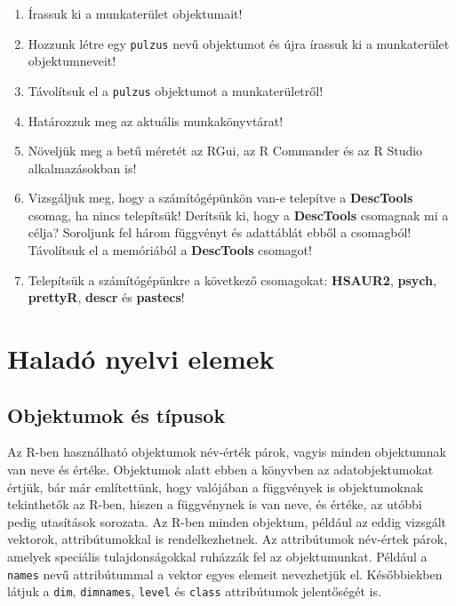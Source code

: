 \documentclass[
]{book}
\makeatletter
\providecommand{\tightlist}{%
  \setlength{\itemsep}{0pt}\setlength{\parskip}{0pt}}
\newenvironment{kframe}{%
\medskip{}
\setlength{\fboxsep}{.8em}
 \def\at@end@of@kframe{}%
 \ifinner\ifhmode%
  \def\at@end@of@kframe{\end{minipage}}%
  \begin{minipage}{\columnwidth}%
 \fi\fi%
 \def\FrameCommand##1{\hskip\@totalleftmargin \hskip-\fboxsep
 \colorbox{shadecolor}{##1}\hskip-\fboxsep
     \hskip-\linewidth \hskip-\@totalleftmargin \hskip\columnwidth}%
 \MakeFramed {\advance\hsize-\width
   \@totalleftmargin\z@ \linewidth\hsize
   \@setminipage}}%
 {\par\unskip\endMakeFramed%
 \at@end@of@kframe}
\newenvironment{rmdblock}[1]
  {
  \begin{itemize}
  \renewcommand{\labelitemi}{
    \raisebox{-.7\height}[0pt][0pt]{
      {\setkeys{Gin}{width=3em,keepaspectratio}\texttt{[image: images/\#1]}}
    }
  }
  \setlength{\fboxsep}{1em}
  \begin{kframe}
  \item
  }
  {
  \end{kframe}
  \end{itemize}
  }
\newenvironment{rmdlevel1}
  {\begin{rmdblock}{level1}}
  {\end{rmdblock}}
\makeatother
\begin{document}
\begin{rmdlevel1}
\begin{enumerate}
\def\labelenumi{\arabic{enumi}.}
\tightlist
\item
  Írassuk ki a munkaterület objektumait!
\item
  Hozzunk létre egy \texttt{pulzus} nevű objektumot és újra írassuk ki a munkaterület objektumneveit!
\item
  Távolítsuk el a \texttt{pulzus} objektumot a munkaterületről!
\item
  Határozzuk meg az aktuális munkakönyvtárat!
\item
  Növeljük meg a betű méretét az RGui, az R Commander és az R Studio alkalmazásokban is!
\item
  Vizsgáljuk meg, hogy a számítógépünkön van-e telepítve a \textbf{DescTools} csomag, ha nincs telepítsük! Derítsük ki, hogy a \textbf{DescTools} csomagnak mi a célja? Soroljunk fel három függvényt és adattáblát ebből a csomagból! Távolítsuk el a memóriából a \textbf{DescTools} csomagot!
\item
  Telepítsük a számítógépünkre a következő csomagokat: \textbf{HSAUR2}, \textbf{psych}, \textbf{prettyR}, \textbf{descr} és \textbf{pastecs}!
\end{enumerate}
\end{rmdlevel1}

\hypertarget{haladuxf3-nyelvi-elemek}{%
\section{Haladó nyelvi elemek}\label{haladuxf3-nyelvi-elemek}}

\hypertarget{objektumok-uxe9s-tuxedpusok}{%
\subsection{Objektumok és típusok}\label{objektumok-uxe9s-tuxedpusok}}

Az R-ben használható objektumok név-érték párok, vagyis minden objektumnak van neve és értéke. Objektumok alatt ebben a könyvben az adatobjektumokat értjük, bár már említettünk, hogy valójában a függvények is objektumoknak tekinthetők az R-ben, hiszen a függvénynek is van neve, és értéke, az utóbbi pedig utasítások sorozata. Az R-ben minden objektum, például az eddig vizsgált vektorok, attribútumokkal is rendelkezhetnek. Az attribútumok név-értek párok, amelyek speciális tulajdonságokkal ruházzák fel az objektumunkat. Például a \texttt{names} nevű attribútummal a vektor egyes elemeit nevezhetjük el. Későbbiekben látjuk a \texttt{dim}, \texttt{dimnames}, \texttt{level} és \texttt{class} attribútumok jelentőségét is.
\end{document}
